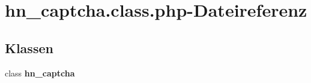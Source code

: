\section{hn\_\-captcha.class.php-Dateireferenz}
\label{hn__captcha_8class_8php}
\subsection*{Klassen}
\begin{CompactItemize}
\item 
class {\bf hn\_\-captcha}
\end{CompactItemize}
